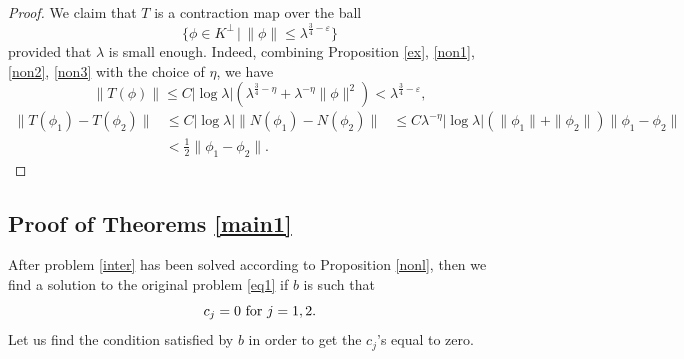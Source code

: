 \documentclass[reqno,11pt]{amsart}
\theoremstyle{definition}
\numberwithin{equation}{section}
\newcommand{\la}{\lambda}
\newcommand{\e}{\varepsilon}
\renewcommand{\(}{\left(}
\renewcommand{\)}{\right)}
\renewcommand{\[}{\left[}
\renewcommand{\]}{\right]}
\begin{document}
{\begin{proof}
We claim that $T$ is a contraction map over the ball $$\Big\{\phi\in K^\perp\,\Big|\, \|\phi\|\leq \la^{\frac34-\e}\Big\}$$ provided that $\la$ is small enough. Indeed, combining  Proposition \ref{ex}, \eqref{non1}, \eqref{non2}, \eqref{non3} with the choice of $\eta$,
we have 
$$\|T(\phi)\|\leq C|\log\la|(\la^{\frac34-\eta}+\la^{-\eta}\|\phi\|^2)<\la^{\frac34-\e},$$
$$\begin{aligned}\|T(\phi_1)-T(\phi_2)\|&\leq C|\log\la|\|N(\phi_1)-N(\phi_2)\|&\leq C\la^{-\eta}|\log\la| (\|\phi_1\|+\|\phi_2\|)\|\phi_1-\phi_2\|\\ &<\frac12\|\phi_1-\phi_2\|.\end{aligned}$$


\end{proof}



 
 





 
\subsection*{{\large{Proof of Theorems \ref{main1}}}} 
After problem \eqref{inter} has been solved according to Proposition \ref{nonl}, then we find a solution to the original problem \eqref{eq1} if $b$   is such that $$c_j=0\hbox{ for }j=1,2.$$ 
 Let us find the condition satisfied by $b$ in order to get the $c_j$'s equal to zero. 

}
\end{document}
